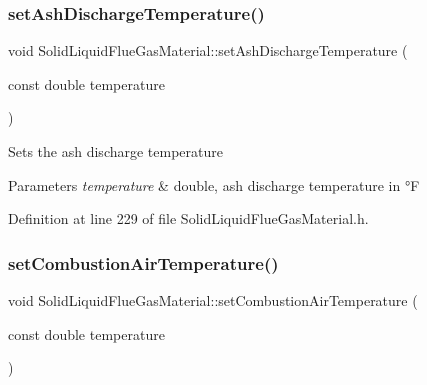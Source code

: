 \mbox{\label{class_solid_liquid_flue_gas_material_ad29543a88737c3d051c7d824287bc791}} 
\subsubsection{\texorpdfstring{set\+Ash\+Discharge\+Temperature()}{setAshDischargeTemperature()}}
{\footnotesize\ttfamily void Solid\+Liquid\+Flue\+Gas\+Material\+::set\+Ash\+Discharge\+Temperature (\begin{DoxyParamCaption}\item[{const double}]{temperature }\end{DoxyParamCaption})\hspace{0.3cm}{\ttfamily [inline]}}

Sets the ash discharge temperature 
\begin{DoxyParams}{Parameters}
{\em temperature} & double, ash discharge temperature in °F \\
\hline
\end{DoxyParams}


Definition at line 229 of file Solid\+Liquid\+Flue\+Gas\+Material.\+h.

\mbox{\label{class_solid_liquid_flue_gas_material_a626dfbc9ba87abff99e5c5a8204d69c6}} 
\subsubsection{\texorpdfstring{set\+Combustion\+Air\+Temperature()}{setCombustionAirTemperature()}}
{\footnotesize\ttfamily void Solid\+Liquid\+Flue\+Gas\+Material\+::set\+Combustion\+Air\+Temperature (\begin{DoxyParamCaption}\item[{const double}]{temperature }\end{DoxyParamCaption})\hspace{0.3cm}{\ttfamily [inline]}}

